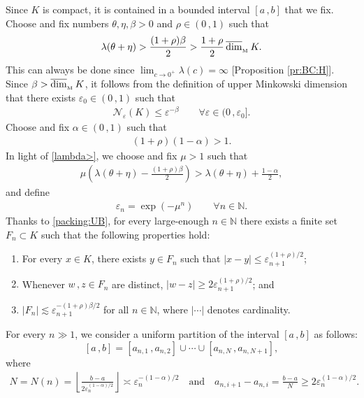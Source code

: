 \documentclass[reqno]{amsart}
\DeclareMathOperator{\dimm}{\overline{dim}_{_{\rm M}}}
\newcommand{\<}{\langle}
\renewcommand{\>}{\rangle}
\newcommand{\N}{\mathbb{N}}
\newcommand{\1}{\mathbb{1}}
\renewcommand{\ge}{\geqslant}
\renewcommand{\le}{\leqslant}
\theoremstyle{definition}
\numberwithin{equation}{section}
\begin{document}
Since $K$ is compact, it is contained in a bounded interval $[a\,,b]$ that we fix.
Choose and fix numbers $\theta,\eta,\beta > 0$ and $\rho\in (0\,,1)$ such that
\begin{align}\label{lambda>}
	\lambda(\theta+\eta) > \frac{(1+\rho)\beta}{2}
	> \frac{1+\rho}{2} \dimm K.
\end{align}
This can always be done since $\lim_{c\to0^+}\lambda(c)=\infty$
[Proposition \ref{pr:BC:H}].
Since $\beta> \dimm K$, it follows from the definition of upper Minkowski dimension
that there exists $\varepsilon_0 \in (0\,,1)$ such that
\begin{align}\label{packing:UB}
	\mathscr{N}_{\varepsilon}(K) \le \varepsilon^{-\beta} \qquad \forall \varepsilon \in (0\,,\varepsilon_0].
\end{align}
Choose and fix $\alpha \in (0\,,1)$ such that
\begin{align}\label{rho:alpha:>1}
	(1+\rho)(1-\alpha)>1.
\end{align}
In light of \eqref{lambda>}, we choose and fix $\mu>1$ such that
\begin{align}\label{mu}
	\mu\left(\lambda(\theta+\eta)-\frac{(1+\rho)\beta}{2}\right)
	> \lambda(\theta+\eta) + \frac{1-\alpha}{2},
\end{align}
and define
\begin{align}\label{eps_n}
	\varepsilon_n = \exp(-\mu^n) \qquad \forall n\in\N.
\end{align}
Thanks to \eqref{packing:UB}, for every large-enough $n \in \N$ there exists a
finite set $F_n\subset K$ such that the following properties hold:
\begin{enumerate}[\bf Property A.]
	\item For every $x \in K$, there exists $y \in F_n$ such that 
		$|x-y| \le \varepsilon_{n+1}^{(1+\rho)/2}$;	\label{pack}
	\item Whenever $w\,,z \in F_n$ are distinct, 
		$|w-z| \ge 2\varepsilon_{n+1}^{(1+\rho)/2}$; and
	\item	$|F_n| \lesssim \varepsilon_{n+1}^{-(1+\rho)\beta/2}$ for all $n\in\N$,
		where $|\cdots|$ denotes cardinality.
	\label{|F|}
\end{enumerate}
For every $n \gg 1$, we consider a uniform partition of the interval $[a\,,b]$ 
as follows:
\[
	[a\,,b] = [a_{n,1}\,,a_{n,2}] \cup \cdots \cup [a_{n,N}\,,a_{n,N+1}],	
\]
where
\begin{align}\label{N}
	N=N(n) = \left\lfloor \frac{b-a}{2\varepsilon_n^{(1-\alpha)/2}} 
	\right\rfloor \asymp \varepsilon_n^{-(1-\alpha)/2}
	\quad \text{and}\quad
	a_{n,i+1}-a_{n,i} = \frac{b-a}{N} \ge 2 \varepsilon_n^{(1-\alpha)/2}.
\end{align}
\end{document}
